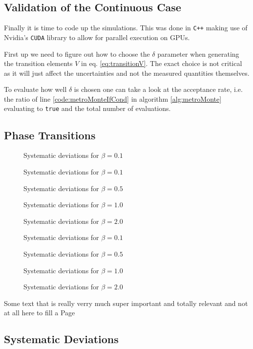 \subsection{Validation of the Continuous Case}

Finally it is time to code up the simulations. This was done in \texttt{C++} making use of Nvidia's \texttt{CUDA} library to allow for parallel execution on GPUs.

First up we need to figure out how to choose the $\delta$ parameter when generating the transition elements $V$ in eq. \ref{eq:transitionV}. The exact choice is not critical as it will just affect the uncertainties and not the measured quantities themselves.

To evaluate how well $\delta$ is chosen one can take a look at the acceptance rate, i.e. the ratio of line \ref{code:metroMonteIfCond} in algorithm \ref{alg:metroMonte} evaluating to \texttt{true} and the total number of evaluations.

\cite{Creutz:1981}

\subsection{Phase Transitions}

\begin{figure}[!hbt]
 \centering
 
 \caption{Systematic deviations for $\beta = 0.1$}
\end{figure}
\begin{figure}[!hbt]
 \centering
 
 \caption{Systematic deviations for $\beta = 0.1$}
\end{figure}
\begin{figure}[!hbt]
 \centering
 
 \caption{Systematic deviations for $\beta = 0.5$}
\end{figure}
\begin{figure}[!hbt]
 \centering
 
 \caption{Systematic deviations for $\beta = 1.0$}
\end{figure}
\begin{figure}[!hbt]
 \centering
 
 \caption{Systematic deviations for $\beta = 2.0$}
\end{figure}



\begin{figure}[!hbt]
 \centering
 
 \caption{Systematic deviations for $\beta = 0.1$}
\end{figure}
\begin{figure}[!hbt]
 \centering
 
 \caption{Systematic deviations for $\beta = 0.5$}
\end{figure}
\begin{figure}[!hbt]
 \centering
 
 \caption{Systematic deviations for $\beta = 1.0$}
\end{figure}
\begin{figure}[!hbt]
 \centering
 
 \caption{Systematic deviations for $\beta = 2.0$}
\end{figure}


Some text that is really verry much super important and totally relevant and not at all here to fill a Page
\subsection{Systematic Deviations}
